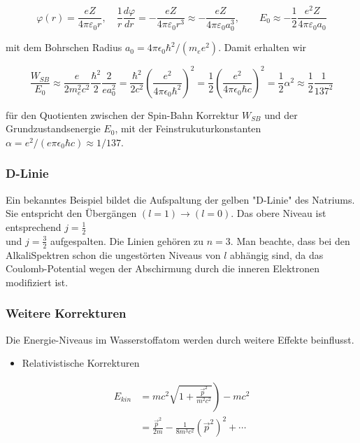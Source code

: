 \documentclass[10pt, letterpaper]{article}
\begin{document}
$$
\varphi(r)=\frac{e Z}{4 \pi \varepsilon_{0} r}, \quad \frac{1}{r} \frac{d \varphi}{d r}=-\frac{e Z}{4 \pi \varepsilon_{0} r^{3}} \approx-\frac{e Z}{4 \pi \varepsilon_{0} a_{0}^{3}}, \quad \quad E_{0} \approx-\frac{1}{2} \frac{e^{2} Z}{4 \pi \varepsilon_{0} a_{0}}
$$

mit dem Bohrschen Radius $a_{0}=4 \pi \epsilon_{0} \hbar^{2} /\left(m_{e} e^{2}\right)$. Damit erhalten wir

$$
\frac{W_{S B}}{E_{0}} \approx \frac{e}{2 m_{e}^{2} c^{2}} \frac{\hbar^{2}}{2} \frac{2}{e a_{0}^{2}}=\frac{\hbar^{2}}{2 c^{2}}\left(\frac{e^{2}}{4 \pi \epsilon_{0} \hbar^{2}}\right)^{2}=\frac{1}{2}\left(\frac{e^{2}}{4 \pi \epsilon_{0} \hbar c}\right)^{2}=\frac{1}{2} \alpha^{2} \approx \frac{1}{2} \frac{1}{137^{2}}
$$

für den Quotienten zwischen der Spin-Bahn Korrektur $W_{S B}$ und der Grundzustandsenergie $E_{0}$, mit der Feinstrukuturkonstanten $\alpha=e^{2} /\left(e \pi \epsilon_{0} \hbar c\right) \approx 1 / 137$.

\subsubsection*{D-Linie}
Ein bekanntes Beispiel bildet die Aufspaltung der gelben "D-Linie" des Natriums. Sie entspricht den Übergängen $(l=1) \rightarrow(l=0)$. Das obere Niveau ist entsprechend $j=\frac{1}{2}$\\
und $j=\frac{3}{2}$ aufgespalten. Die Linien gehören zu $n=3$. Man beachte, dass bei den AlkaliSpektren schon die ungestörten Niveaus von $l$ abhängig sind, da das Coulomb-Potential wegen der Abschirmung durch die inneren Elektronen modifiziert ist.

\subsubsection*{Weitere Korrekturen}
Die Energie-Niveaus im Wasserstoffatom werden durch weitere Effekte beinflusst.

\begin{itemize}
  \item Relativistische Korrekturen
\end{itemize}

$$
\begin{aligned}
E_{k i n} & \left.=m c^{2} \sqrt{1+\frac{\vec{p}^{2}}{m^{2} c^{2}}}\right)-m c^{2} \\
& =\frac{\vec{p}^{2}}{2 m}-\frac{1}{8 m^{3} c^{2}}\left(\vec{p}^{2}\right)^{2}+\cdots
\end{aligned}
$$
\end{document}
